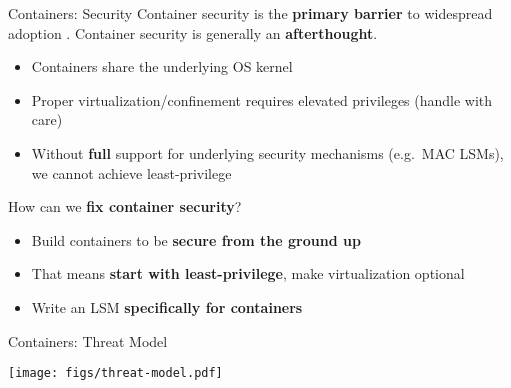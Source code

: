 \documentclass[12pt, dvipsnames, aspectratio=169]{beamer}
\newcommand{\blue}[1]{{\color{blue}#1}}
\newcommand{\orange}[1]{{\color{orange}#1}}
\begin{document}
\begin{frame}[c]{Containers: Security}
Container security is the \textbf{primary barrier} to widespread adoption \cite{sultan2019_container_security}.
\vfill
Container security is generally an \textbf{afterthought}.
\begin{itemize}
  \item Containers share the underlying OS kernel
  \item Proper virtualization/confinement requires elevated privileges (handle with care)
  \item Without \textbf{full} support for underlying security mechanisms
  (e.g.~MAC LSMs), we cannot achieve \blue{least-privilege}
\end{itemize}
\vfill
How can we \textbf{fix container security}?
\begin{itemize}
  \item Build containers to be \textbf{secure from the ground up}
  \item That means \textbf{start with \blue{least-privilege}}, make \orange{virtualization} optional
  \item Write an LSM \textbf{specifically for containers} \cite{sultan2019_container_security}
\end{itemize}
\end{frame}

\begin{frame}[c]{Containers: Threat Model}
\begin{center}
  \color{black}
  \texttt{[image: figs/threat-model.pdf]}
\end{center}
\end{frame}
\end{document}
